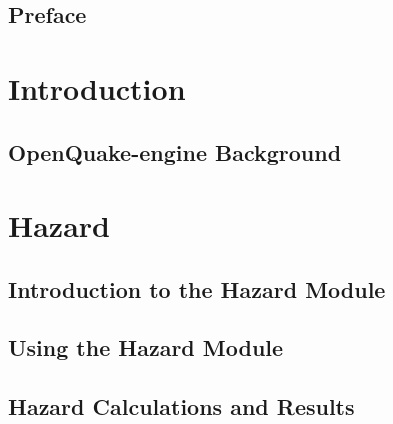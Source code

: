 \documentclass[11pt,fleqn]{book} %
\begin{document}
\chapter*{Preface}



\part{Introduction}
\label{part:introduction}
\chapter{OpenQuake-engine Background}
   \label{chap:intro}
	

\thispagestyle{empty}
\part{Hazard}

\chapter{Introduction to the Hazard Module}
   \label{chap:hazintro}
	
   \cleardoublepage

\chapter{Using the Hazard Module}
	\label{chap:hazinputs}
	
   \cleardoublepage

\chapter{Hazard Calculations and Results}
	\label{chap:hazoutputs}
	
   \cleardoublepage
\end{document}
